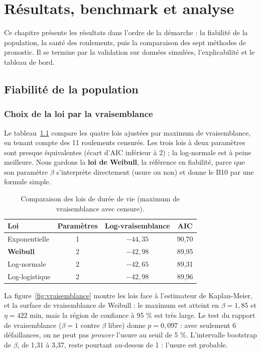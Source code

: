 \chapter{Résultats, benchmark et analyse}

\chapintro
Ce chapitre présente les résultats dans l'ordre de la démarche : la fiabilité de la population, la santé des roulements, puis la comparaison des sept méthodes de pronostic. Il se termine par la validation sur données simulées, l'explicabilité et le tableau de bord.

\section{Fiabilité de la population}

\subsection{Choix de la loi par la vraisemblance}
Le tableau~\ref{tab:lois} compare les quatre lois ajustées par maximum de vraisemblance, en tenant compte des 11 roulements censurés. Les trois lois à deux paramètres sont presque équivalentes (écart d'AIC inférieur à 2) ; la log-normale est à peine meilleure. Nous gardons la \textbf{loi de Weibull}, la référence en fiabilité, parce que son paramètre $\beta$ s'interprète directement (usure ou non) et donne le B10 par une formule simple.

\begin{table}[H]
\centering\small
\begin{tabular}{lccc}
\toprule
Loi & Paramètres & Log-vraisemblance & AIC \\
\midrule
Exponentielle & 1 & $-44{,}35$ & 90,70 \\
\textbf{Weibull} & 2 & $-42{,}98$ & 89,95 \\
Log-normale & 2 & $-42{,}65$ & 89,31 \\
Log-logistique & 2 & $-42{,}98$ & 89,96 \\
\bottomrule
\end{tabular}
\caption[Comparaison des lois par la vraisemblance]{Comparaison des lois de durée de vie (maximum de vraisemblance avec censure).}
\label{tab:lois}
\end{table}

La figure~\ref{fig:vraisemblance} montre les lois face à l'estimateur de Kaplan-Meier, et la surface de vraisemblance de Weibull : le maximum est atteint en $\beta = 1{,}85$ et $\eta = 422$ min, mais la région de confiance à 95 \% est très large. Le test du rapport de vraisemblance ($\beta = 1$ contre $\beta$ libre) donne $p = 0{,}097$ : avec seulement 6 défaillances, on ne peut pas \emph{prouver} l'usure au seuil de 5 \%. L'intervalle bootstrap de $\beta$, de 1,31 à 3,37, reste pourtant au-dessus de 1 : l'usure est probable.

